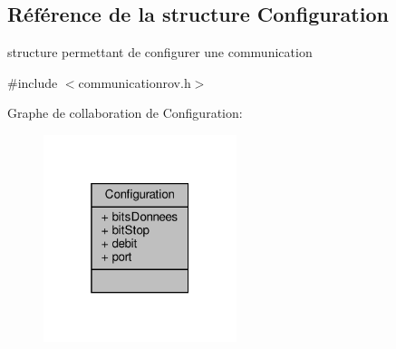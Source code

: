 \hypertarget{struct_configuration}{}\subsection{Référence de la structure Configuration}
\label{struct_configuration}


structure permettant de configurer une communication  




{\ttfamily \#include $<$communicationrov.\+h$>$}



Graphe de collaboration de Configuration\+:\nopagebreak
\begin{figure}[H]
\begin{center}
\leavevmode
\includegraphics[width=160pt]{struct_configuration__coll__graph}
\end{center}
\end{figure}
